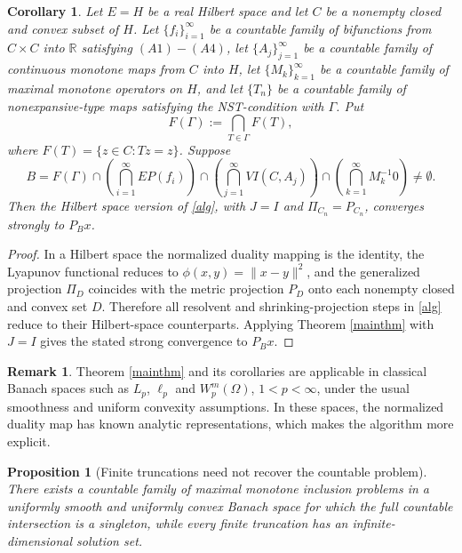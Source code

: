 \documentclass[leqno,12pt]{amsart}
\newtheorem{proposition}[theorem]{Proposition}
\newtheorem{corollary}[theorem]{Corollary}
\theoremstyle{definition}
\newtheorem{remark}[theorem]{Remark}
\numberwithin{equation}{section}
\begin{document}
\begin{corollary}\label{hilbert}
Let $E=H$ be a real Hilbert space and let $C$ be a nonempty closed and convex subset of $H$. Let $\{f_i\}_{i=1}^{\infty}$ be a countable family of bifunctions from $C\times C$ into $\mathbb{R}$ satisfying $(A1)-(A4)$, let $\{A_j\}_{j=1}^{\infty}$ be a countable family of continuous monotone maps from $C$ into $H$, let $\{M_k\}_{k=1}^{\infty}$ be a countable family of maximal monotone operators on $H$, and let $\{T_n\}$ be a countable family of nonexpansive-type maps satisfying the NST-condition with $\Gamma$. Put
\[
F(\Gamma):=\bigcap_{T\in\Gamma}F(T),
\]
where $F(T)=\{z\in C:Tz=z\}$. Suppose
\[
B=F(\Gamma)\cap\left(\bigcap_{i=1}^{\infty}EP(f_i)\right)
\cap\left(\bigcap_{j=1}^{\infty}VI(C,A_j)\right)
\cap\left(\bigcap_{k=1}^{\infty}M_k^{-1}0\right)\neq\emptyset.
\]
Then the Hilbert space version of \eqref{alg}, with $J=I$ and $\Pi_{C_n}=P_{C_n}$, converges strongly to $P_Bx$.
\end{corollary}

\begin{proof}
In a Hilbert space the normalized duality mapping is the identity, the Lyapunov functional reduces to $\phi(x,y)=\|x-y\|^2$, and the generalized projection $\Pi_D$ coincides with the metric projection $P_D$ onto each nonempty closed and convex set $D$. Therefore all resolvent and shrinking-projection steps in \eqref{alg} reduce to their Hilbert-space counterparts. Applying Theorem \ref{mainthm} with $J=I$ gives the stated strong convergence to $P_Bx$.
\end{proof}

\begin{remark}
Theorem \ref{mainthm} and its corollaries are applicable in classical Banach spaces such as $L_p$, $\ell_p$ and $W_p^m(\Omega)$, $1<p<\infty$, under the usual smoothness and uniform convexity assumptions. In these spaces, the normalized duality map has known analytic representations, which makes the algorithm more explicit.
\end{remark}


\begin{proposition}[Finite truncations need not recover the countable problem]\label{finite-truncation-prop}
There exists a countable family of maximal monotone inclusion problems in a uniformly smooth and uniformly convex Banach space for which the full countable intersection is a singleton, while every finite truncation has an infinite-dimensional solution set.
\end{proposition}
\end{document}
